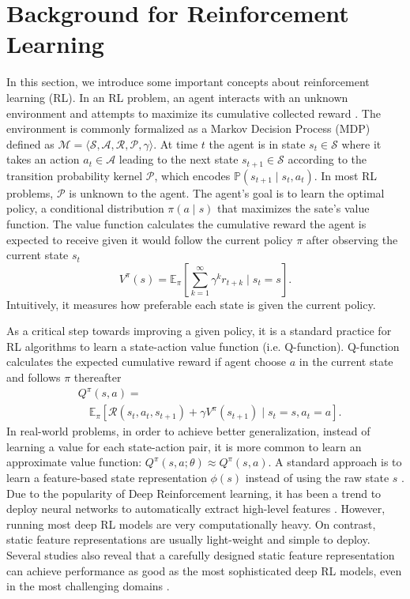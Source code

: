 \documentclass{article}
\begin{document}
\section{Background for Reinforcement Learning}
In this section, we introduce some important concepts about reinforcement learning (RL). In an RL problem, an agent interacts with an unknown environment and attempts to maximize its cumulative collected reward \citep{Sutton98,Szepesvari10}. The environment is commonly formalized as a Markov Decision Process (MDP) defined as $\mathcal{M} = \langle \mathcal{S}, \mathcal{A}, \mathcal{R}, \mathcal{P}, \gamma\rangle$. At time $t$ the agent is in state $s_t \in \mathcal{S}$ where it takes an action $a_t \in \mathcal{A}$ leading to the next state $s_{t+1} \in \mathcal{S}$ according to the transition probability kernel $\mathcal{P}$, which encodes $\mathbb{P}(s_{t+1}\mid s_t,a_t)$. In most RL problems, $\mathcal{P}$ is unknown to the agent. The agent's goal is to learn the optimal policy, a conditional distribution $\pi(a \mid s)$ that  maximizes the sate's value function. The value function calculates the cumulative reward the agent is expected to receive given it would follow the current policy $\pi$ after observing the current state $s_t$
$$
V^\pi(s) = \mathbb{E}_\pi \left[ \sum_{k=1}^\infty \gamma^k r_{t+k} \mid s_t = s   \right].
$$
Intuitively, it measures how preferable each state is given the current policy.

As a critical step towards improving a given policy, it is a standard practice for RL algorithms to learn a state-action value function (i.e. Q-function). Q-function calculates the expected cumulative reward if agent choose $a$ in the current state and follows $\pi$ thereafter
\begin{equation*}
\begin{split}
&Q^\pi(s,a) =\\
& \quad\mathbb{E}_\pi\left[ \mathcal{R}(s_t,a_t,s_{t+1}) + \gamma V^\pi(s_{t+1}) \mid s_t = s, a_t = a \right].
\end{split}
\end{equation*}
In real-world problems, in order to achieve better generalization, instead of learning a value for each state-action pair, it is more common to learn an approximate value function: $Q^\pi(s,a; \theta) \approx Q^\pi(s,a)$. A standard approach is to learn a feature-based state representation $\phi(s)$ instead of using the raw state $s$ \citep{Gordon00}. Due to the popularity of Deep Reinforcement learning, it has been a trend to deploy neural networks to automatically extract high-level features \citep{Silver17,Mnih15}. However, running most deep RL models are very computationally heavy. On contrast, static feature representations are usually light-weight and simple to deploy. Several studies also reveal that a carefully designed static feature representation can achieve performance as good as the most sophisticated deep RL models, even in the most challenging domains \citep{Liang16}.
\end{document}
